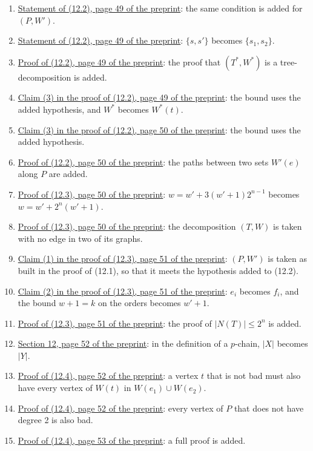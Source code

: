 \begin{enumerate}
asks also that every vertex of an inner graph $W(t)$ be in $W(e)$ for an edge $e$ of $P$ at $t$.
\item {}\hyperref[fix:12.2]{Statement of (12.2), page 49 of the preprint}: the same condition is
added for $(P, W')$.
\item {}\hyperref[fix:12.2-ends]{Statement of (12.2), page 49 of the preprint}: $\{s, s'\}$ becomes
$\{s_1, s_2\}$.
\item {}\hyperref[fix:12.2-tree-proof-added]{Proof of (12.2), page 49 of the preprint}: the proof that $(T^*, W^*)$ is a tree-decomposition is added.
\item {}\hyperref[fix:12.2-claim3]{Claim (3) in the proof of (12.2), page 49 of the preprint}: the
bound uses the added hypothesis, and $W^*$ becomes $W^*(t)$.
\item {}\hyperref[fix:12.2-claim3-p50]{Claim (3) in the proof of (12.2), page 50 of the preprint}:
the bound uses the added hypothesis.
\item {}\hyperref[fix:12.2-path-proof-added]{Proof of (12.2), page 50 of the preprint}: the paths between two sets $W'(e)$ along $P$ are added.
\item {}\hyperref[fix:12.3-w]{Proof of (12.3), page 50 of the preprint}:
$w = w' + 3(w' + 1)2^{n-1}$ becomes $w = w' + 2^n(w' + 1)$.
\item {}\hyperref[fix:12.3-trim]{Proof of (12.3), page 50 of the preprint}: the decomposition $(T, W)$
is taken with no edge in two of its graphs.
\item {}\hyperref[fix:12.3-claim1]{Claim (1) in the proof of (12.3), page 51 of the preprint}:
$(P, W')$ is taken as built in the proof of (12.1), so that it meets the hypothesis added to
(12.2).
\item {}\hyperref[fix:12.3-claim2]{Claim (2) in the proof of (12.3), page 51 of the preprint}:
$e_i$ becomes $f_i$, and the bound $w + 1 = k$ on the orders becomes $w' + 1$.
\item {}\hyperref[fix:12.3-count-proof-added]{Proof of (12.3), page 51 of the preprint}: the proof of $|N(T)| \le 2^n$ is added.
\item {}\hyperref[fix:12-chain]{Section 12, page 52 of the preprint}: in the definition of a
$p$-chain, $|X|$ becomes $|Y|$.
\item {}\hyperref[fix:12.4-bad]{Proof of (12.4), page 52 of the preprint}: a vertex $t$ that is
not bad must also have every vertex of $W(t)$ in $W(e_1) \cup W(e_2)$.
\item {}\hyperref[fix:12.4-ends]{Proof of (12.4), page 52 of the preprint}: every vertex of $P$
that does not have degree 2 is also bad.
\item {}\hyperref[fix:12.4-proof-added]{Proof of (12.4), page 53 of the preprint}: a full proof is added.
\end{enumerate}
